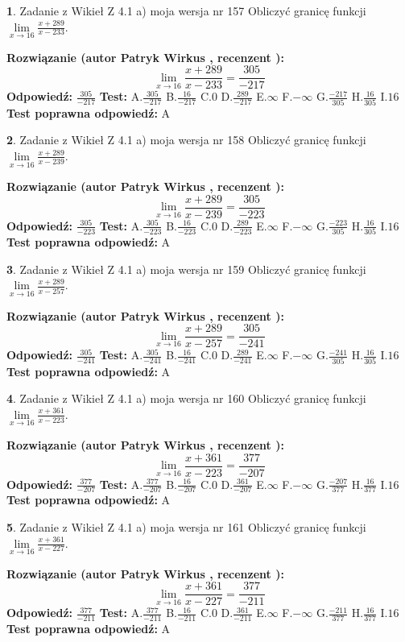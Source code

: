 \documentclass[12pt, a4paper]{article}
\theoremstyle{definition} %
\newtheorem{zad}{}
\newcommand{\zadStart}[1]{\begin{zad}#1\newline}
\newcommand{\zadStop}{\end{zad}}
\newcommand{\rozwStart}[2]{\noindent \textbf{Rozwiązanie (autor #1 , recenzent #2): }\newline}
\newcommand{\rozwStop}{\newline}
\newcommand{\odpStart}{\noindent \textbf{Odpowiedź:}\newline}
\newcommand{\odpStop}{\newline}
\newcommand{\testStart}{\noindent \textbf{Test:}\newline}
\newcommand{\testStop}{\newline}
\newcommand{\kluczStart}{\noindent \textbf{Test poprawna odpowiedź:}\newline}
\newcommand{\kluczStop}{\newline}
\begin{document}
\zadStart{Zadanie z Wikieł Z 4.1 a) moja wersja nr 157}
Obliczyć granicę funkcji $\lim\limits_{x\to16}\frac{x+289}{x-233}$.
\zadStop
\rozwStart{Patryk Wirkus}{}
$$\lim\limits_{x\to16}\frac{x+289}{x-233} = \frac{305}{-217}$$
\rozwStop
\odpStart
$\frac{305}{-217}$
\odpStop
\testStart
A.$\frac{305}{-217}$
B.$\frac{16}{-217}$
C.$0$
D.$\frac{289}{-217}$
E.$\infty$
F.$-\infty$
G.$\frac{-217}{305}$
H.$\frac{16}{305}$
I.$16$
\testStop
\kluczStart
A
\kluczStop



\zadStart{Zadanie z Wikieł Z 4.1 a) moja wersja nr 158}
Obliczyć granicę funkcji $\lim\limits_{x\to16}\frac{x+289}{x-239}$.
\zadStop
\rozwStart{Patryk Wirkus}{}
$$\lim\limits_{x\to16}\frac{x+289}{x-239} = \frac{305}{-223}$$
\rozwStop
\odpStart
$\frac{305}{-223}$
\odpStop
\testStart
A.$\frac{305}{-223}$
B.$\frac{16}{-223}$
C.$0$
D.$\frac{289}{-223}$
E.$\infty$
F.$-\infty$
G.$\frac{-223}{305}$
H.$\frac{16}{305}$
I.$16$
\testStop
\kluczStart
A
\kluczStop



\zadStart{Zadanie z Wikieł Z 4.1 a) moja wersja nr 159}
Obliczyć granicę funkcji $\lim\limits_{x\to16}\frac{x+289}{x-257}$.
\zadStop
\rozwStart{Patryk Wirkus}{}
$$\lim\limits_{x\to16}\frac{x+289}{x-257} = \frac{305}{-241}$$
\rozwStop
\odpStart
$\frac{305}{-241}$
\odpStop
\testStart
A.$\frac{305}{-241}$
B.$\frac{16}{-241}$
C.$0$
D.$\frac{289}{-241}$
E.$\infty$
F.$-\infty$
G.$\frac{-241}{305}$
H.$\frac{16}{305}$
I.$16$
\testStop
\kluczStart
A
\kluczStop



\zadStart{Zadanie z Wikieł Z 4.1 a) moja wersja nr 160}
Obliczyć granicę funkcji $\lim\limits_{x\to16}\frac{x+361}{x-223}$.
\zadStop
\rozwStart{Patryk Wirkus}{}
$$\lim\limits_{x\to16}\frac{x+361}{x-223} = \frac{377}{-207}$$
\rozwStop
\odpStart
$\frac{377}{-207}$
\odpStop
\testStart
A.$\frac{377}{-207}$
B.$\frac{16}{-207}$
C.$0$
D.$\frac{361}{-207}$
E.$\infty$
F.$-\infty$
G.$\frac{-207}{377}$
H.$\frac{16}{377}$
I.$16$
\testStop
\kluczStart
A
\kluczStop



\zadStart{Zadanie z Wikieł Z 4.1 a) moja wersja nr 161}
Obliczyć granicę funkcji $\lim\limits_{x\to16}\frac{x+361}{x-227}$.
\zadStop
\rozwStart{Patryk Wirkus}{}
$$\lim\limits_{x\to16}\frac{x+361}{x-227} = \frac{377}{-211}$$
\rozwStop
\odpStart
$\frac{377}{-211}$
\odpStop
\testStart
A.$\frac{377}{-211}$
B.$\frac{16}{-211}$
C.$0$
D.$\frac{361}{-211}$
E.$\infty$
F.$-\infty$
G.$\frac{-211}{377}$
H.$\frac{16}{377}$
I.$16$
\testStop
\kluczStart
A
\kluczStop
\end{document}

